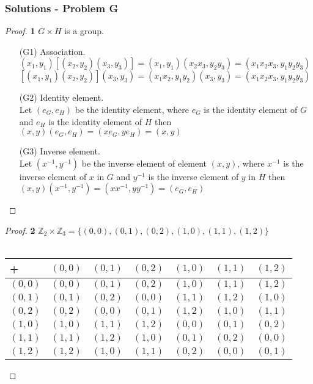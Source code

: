 \documentclass[11pt]{article}
\begin{document}
\cleardoublepage
	\subsubsection*{Solutions - Problem G}
		\begin{proof}{\textbf{1}} $G \times H$ is a group.
			\begin{itemize}
				\item[(G1)] Association.\\
				$(x_1,y_1)[(x_2,y_2)(x_3,y_3)]=(x_1,y_1)(x_2x_3,y_2y_3)=(x_1x_2x_3,y_1y_2y_3)$\\
				$[(x_1,y_1)(x_2,y_2)](x_3,y_3)=(x_1x_2,y_1y_2)(x_3,y_3)=(x_1x_2x_3,y_1y_2y_3)$\\
				\item[(G2)] Identity element.\\
				Let $(e_G, e_H)$ be the identity element, where $e_G$ is the identity element of $G$ and $e_H$ is the identity element of $H$ then\\
				$(x,y)(e_G,e_H)=(xe_G,ye_H)=(x,y)$
				\item[(G3)] Inverse element.\\
				Let $(x^{-1},y^{-1})$ be the inverse element of element $(x,y)$, where $x^{-1}$ is the inverse element of $x$ in $G$ and $y^{-1}$ is the inverse element of $y$ in $H$ then $(x,y)(x^{-1},y^{-1}) = (xx^{-1}, yy^{-1})=(e_G, e_H)$	
			\end{itemize}
		\end{proof}
		\begin{proof}{\textbf{2}}
			$\mathbb{Z}_2 \times \mathbb{Z}_3 = \{(0,0),(0,1),(0,2),(1,0),(1,1),(1,2)\}$\\\\
			\begin{adjustbox}{max width=\textwidth,center}
			\begin{tabular}{l|llllll}
				   +    & $(0,0)$ & $(0,1)$ & $(0,2)$ & $(1,0)$ & $(1,1)$ & $(1,2)$ \\ \hline
				$(0,0)$ & $(0,0)$ & $(0,1)$ & $(0,2)$ & $(1,0)$ & $(1,1)$ & $(1,2)$ \\
				$(0,1)$ & $(0,1)$ & $(0,2)$ & $(0,0)$ & $(1,1)$ & $(1,2)$ & $(1,0)$ \\
				$(0,2)$ & $(0,2)$ & $(0,0)$ & $(0,1)$ & $(1,2)$ & $(1,0)$ & $(1,1)$ \\
				$(1,0)$ & $(1,0)$ & $(1,1)$ & $(1,2)$ & $(0,0)$ & $(0,1)$ & $(0,2)$ \\
				$(1,1)$ & $(1,1)$ & $(1,2)$ & $(1,0)$ & $(0,1)$ & $(0,2)$ & $(0,0)$ \\
				$(1,2)$ & $(1,2)$ & $(1,0)$ & $(1,1)$ & $(0,2)$ & $(0,0)$ & $(0,1)$ \\
			\end{tabular}
			\end{adjustbox}
		\end{proof}
\end{document}
